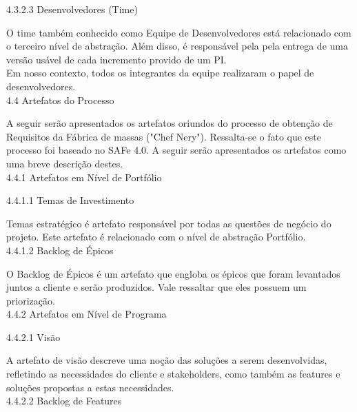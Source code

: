 {\large{4.3.2.3 Desenvolvedores (Time)\\}}

\tab O time também conhecido como Equipe de Desenvolvedores está relacionado com o terceiro nível de abstração. Além disso, é responsável pela pela entrega de uma versão usável de cada incremento provido de um PI. \\
\tab Em nosso contexto, todos os integrantes da equipe realizaram o papel de desenvolvedores. \\




{\large{4.4 Artefatos do Processo \\}}

\tab A seguir serão apresentados os artefatos oriundos do processo de obtenção de Requisitos da Fábrica de massas ("Chef Nery"). Ressalta-se o fato que este processo foi baseado no SAFe 4.0. A seguir serão apresentados os artefatos como uma breve descrição destes. \\



{\large{4.4.1 Artefatos em Nível de Portfólio \\}}


{\large{4.4.1.1 Temas de Investimento \\}}

\tab Temas estratégico é artefato responsável por todas as questões de negócio do projeto. Este artefato é relacionado com o nível de abstração Portfólio. \\




{\large{4.4.1.2 Backlog de  Épicos \\}}

\tab O Backlog de Épicos é um artefato que engloba os épicos que foram levantados juntos a cliente e serão produzidos. Vale ressaltar que eles possuem um priorização. \\


{\large{4.4.2 Artefatos em Nível de Programa \\}}


{\large{4.4.2.1 Visão \\}}

\tab A artefato de visão descreve uma noção das soluções a serem desenvolvidas, refletindo as necessidades do cliente e stakeholders, como também as features e soluções propostas a estas necessidades. \\




{\large{4.4.2.2 Backlog de Features \\}}

